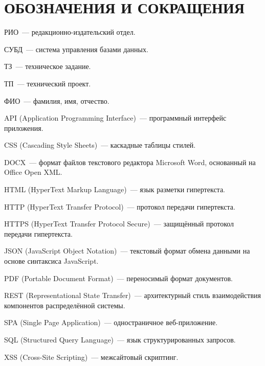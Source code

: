 \section*{ОБОЗНАЧЕНИЯ И СОКРАЩЕНИЯ}




РИО~--- редакционно-издательский отдел.

СУБД~--- система управления базами данных.

ТЗ~--- техническое задание.

ТП~--- технический проект.

ФИО~--- фамилия, имя, отчество.

API (Application Programming Interface)~--- программный интерфейс приложения.

CSS (Cascading Style Sheets)~--- каскадные таблицы стилей.

DOCX~--- формат файлов текстового редактора Microsoft Word, основанный на Office Open XML.

HTML (HyperText Markup Language)~--- язык разметки гипертекста.

HTTP (HyperText Transfer Protocol)~--- протокол передачи гипертекста.

HTTPS (HyperText Transfer Protocol Secure)~--- защищённый протокол передачи гипертекста.

JSON (JavaScript Object Notation)~--- текстовый формат обмена данными на основе синтаксиса JavaScript.

PDF (Portable Document Format)~--- переносимый формат документов.

REST (Representational State Transfer)~--- архитектурный стиль взаимодействия компонентов распределённой системы.

SPA (Single Page Application)~--- одностраничное веб-приложение.

SQL (Structured Query Language)~--- язык структурированных запросов.

XSS (Cross-Site Scripting)~--- межсайтовый скриптинг.